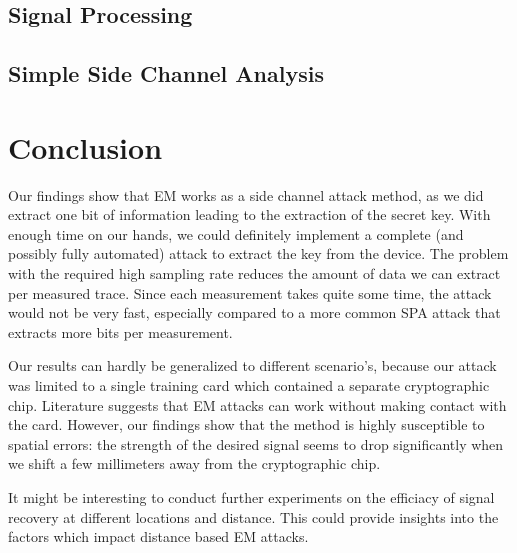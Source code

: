 \documentclass{llncs}
\begin{document}
\subsection{Signal Processing}




\subsection{Simple Side Channel Analysis}




\section{Conclusion}

Our findings show that EM works as a side channel attack method, as we did
extract one bit of information leading to the extraction of the secret key.
With enough time on our hands, we could definitely implement a complete (and
possibly fully automated) attack to extract the key from the device. The
problem with the required high sampling rate reduces the amount of data we can
extract per measured trace. Since each measurement takes quite some time, the
attack would not be very fast, especially compared to a more common SPA attack
that extracts more bits per measurement.

Our results can hardly be generalized to different scenario's, because our
attack was limited to a single training card which contained a separate
cryptographic chip. Literature suggests that EM attacks can work without making
contact with the card. However, our findings show that the method is highly
susceptible to spatial errors: the strength of the desired signal seems to drop 
significantly when we shift a few millimeters away from the cryptographic chip.

It might be interesting to conduct further experiments on the efficiacy of signal recovery 
at different locations and distance. This could provide insights into the factors which 
impact distance based EM attacks.




% 
% 
% 
% 
\end{document}
